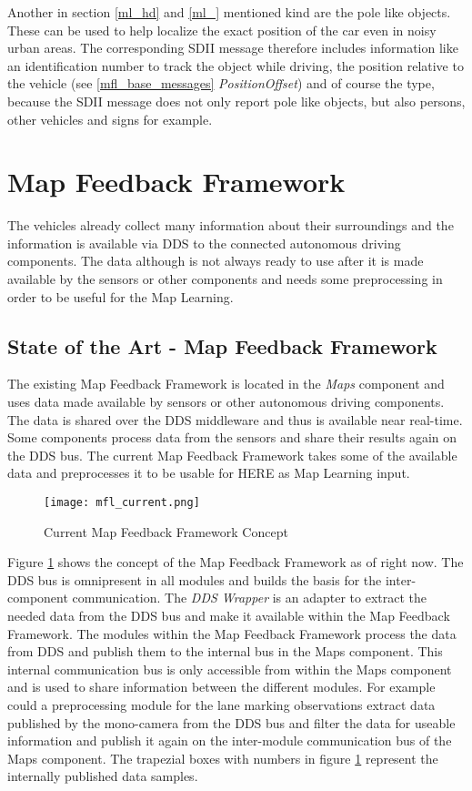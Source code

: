 \par
Another in section \ref{ml_hd} and \ref{ml_} mentioned kind are the pole like objects. These can be used to help localize the exact position of the car even in noisy urban areas. The corresponding SDII message therefore includes information like an identification number to track the object while driving, the position relative to the vehicle (see \ref{mfl_base_messages} \emph{PositionOffset}) and of course the type, because the SDII message does not only report pole like objects, but also persons, other vehicles and signs for example.
\section{Map Feedback Framework}
The vehicles already collect many information about their surroundings and the information is available via \ac{DDS} to the connected autonomous driving components. The data although is not always ready to use after it is made available by the sensors or other components and needs some preprocessing in order to be useful for the Map Learning.
\subsection{State of the Art - Map Feedback Framework}
The existing Map Feedback Framework is located in the \emph{Maps} component and uses data made available by sensors or other autonomous driving components. The data is shared over the DDS middleware and thus is available near real-time. Some components process data from the sensors and share their results again on the DDS bus. The current Map Feedback Framework takes some of the available data and preprocesses it to be usable for HERE as Map Learning input.
\begin{figure}[!hbt]
\texttt{[image: mfl\_current.png]}
\caption{Current Map Feedback Framework Concept}
\label{mfl_current}
\end{figure}
Figure \ref{mfl_current} shows the concept of the Map Feedback Framework as of right now. The DDS bus is omnipresent in all modules and builds the basis for the inter-component communication. The \emph{DDS Wrapper} is an adapter to extract the needed data from the DDS bus and make it available within the Map Feedback Framework. The modules within the Map Feedback Framework process the data from DDS and publish them to the internal bus in the Maps component. This internal communication bus is only accessible from within the Maps component and is used to share information between the different modules. For example could a preprocessing module for the lane marking observations extract data published by the mono-camera from the DDS bus and filter the data for useable information and publish it again on the inter-module communication bus of the Maps component. The trapezial boxes with numbers in figure \ref{mfl_current} represent the internally published data samples.
